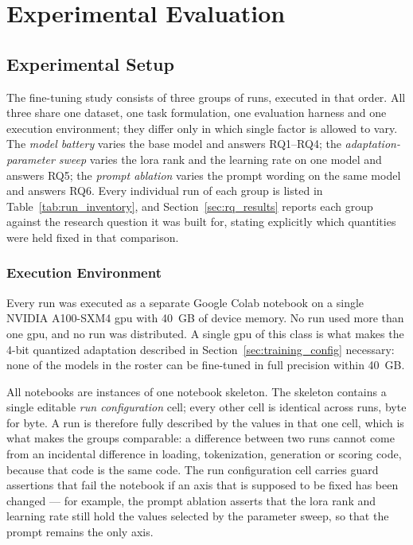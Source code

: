 \setlength{\parindent}{0pt}
\chapter{Experimental Evaluation}

\section{Experimental Setup}
\label{sec:experimental_setup}

The fine-tuning study consists of three groups of runs, executed in that order. All three share one dataset, one task formulation, one evaluation harness and one execution environment; they differ only in which single factor is allowed to vary. The \emph{model battery} varies the base model and answers RQ1--RQ4; the \emph{adaptation-parameter sweep} varies the \gls{lora} rank and the learning rate on one model and answers RQ5; the \emph{prompt ablation} varies the prompt wording on the same model and answers RQ6. Every individual run of each group is listed in Table~\ref{tab:run_inventory}, and Section~\ref{sec:rq_results} reports each group against the research question it was built for, stating explicitly which quantities were held fixed in that comparison.

\subsection{Execution Environment}
\label{sec:exec_environment}

Every run was executed as a separate Google Colab notebook on a single NVIDIA A100-SXM4 \gls{gpu} with 40~GB of device memory. No run used more than one \gls{gpu}, and no run was distributed. A single \gls{gpu} of this class is what makes the 4-bit quantized adaptation described in Section~\ref{sec:training_config} necessary: none of the models in the roster can be fine-tuned in full precision within 40~GB.

All notebooks are instances of one notebook skeleton. The skeleton contains a single editable \emph{run configuration} cell; every other cell is identical across runs, byte for byte. A run is therefore fully described by the values in that one cell, which is what makes the groups comparable: a difference between two runs cannot come from an incidental difference in loading, tokenization, generation or scoring code, because that code is the same code. The run configuration cell carries guard assertions that fail the notebook if an axis that is supposed to be fixed has been changed --- for example, the prompt ablation asserts that the \gls{lora} rank and learning rate still hold the values selected by the parameter sweep, so that the prompt remains the only axis.

